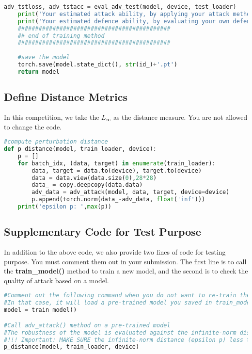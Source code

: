 \begin{lstlisting}[language=Python]
    adv_tstloss, adv_tstacc = eval_adv_test(model, device, test_loader)
    print('Your estimated attack ability, by applying your attack method on your own trained model, is: {:.4f}'.format(1/adv_tstacc))
    print('Your estimated defence ability, by evaluating your own defence model over your attack, is: {:.4f}'.format(adv_tstacc))
    ############################################
    ## end of training method
    ############################################
    
    #save the model
    torch.save(model.state_dict(), str(id_)+'.pt')
    return model
\end{lstlisting}


\subsection*{Define Distance Metrics}

In this competition, we take the $L_\infty$ as the distance measure. You are not allowed to change the code. 

\begin{lstlisting}[language=Python]
#compute perturbation distance
def p_distance(model, train_loader, device):
    p = []
    for batch_idx, (data, target) in enumerate(train_loader):
        data, target = data.to(device), target.to(device)
        data = data.view(data.size(0),28*28)
        data_ = copy.deepcopy(data.data)
        adv_data = adv_attack(model, data, target, device=device)
        p.append(torch.norm(data_-adv_data, float('inf')))
    print('epsilon p: ',max(p))
\end{lstlisting}

\subsection*{Supplementary Code for Test Purpose}

In addition to the above code, we also provide two lines of code for testing purpose. You must comment them out in your submission. 
%
The first line is to call the \textbf{train\_model()} method to train a new model, and the second is to check the quality of attack based on a model. 

\begin{lstlisting}[language=Python]
#Comment out the following command when you do not want to re-train the model
#In that case, it will load a pre-trained model you saved in train_model()
model = train_model()

#Call adv_attack() method on a pre-trained model
#The robustness of the model is evaluated against the infinite-norm distance measure
#!!! Important: MAKE SURE the infinite-norm distance (epsilon p) less than 0.11 !!!
p_distance(model, train_loader, device)
\end{lstlisting}

